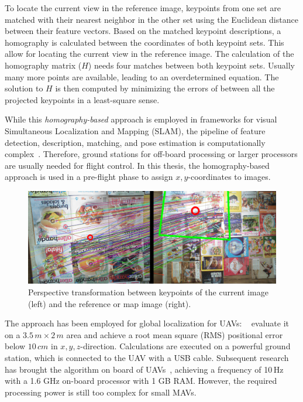 \documentclass[11pt]{report}
\begin{document}
To locate the current view in the reference image, keypoints from one
set are matched with their nearest neighbor in the other set using the
Euclidean distance between their feature vectors. Based on the matched
keypoint descriptions, a homography is calculated between the
coordinates of both keypoint sets. This allow for locating the current
view in the reference image. The calculation of the homography matrix
($H$) needs four matches between both keypoint sets. Usually many more
points are available, leading to an overdetermined equation. The
solution to $H$ is then computed by minimizing the errors of between
all the projected keypoints in a least-square sense.

While this \emph{homography-based} approach is employed in frameworks
for visual Simultaneous Localization and Mapping (SLAM), the pipeline
of feature detection, description, matching, and pose estimation is
computationally complex~\cite{kendall2015posenet}. Therefore, ground
stations for off-board processing or larger processors are usually
needed for flight control. In this thesis, the homography-based
approach is used in a pre-flight phase to assign $x,y$-coordinates to
images.
\begin{figure}[h]
\begin{center}
\includegraphics[width=0.85\columnwidth]{sift}
\caption{{\label{fig:sift}Perspective transformation between keypoints of the current
    image (left) and the reference or map image (right).%
  }}
\end{center}
\end{figure}
The approach has been employed for global localization for UAVs:
\citeauthor{blosch2010vision}~\cite{blosch2010vision} evaluate it on a
$3.5\,m \times 2\,m$ area and achieve a root mean square (RMS)
positional error below $10\,cm$ in $x,y,z$-direction. Calculations are
executed on a powerful ground station, which is connected to the UAV
with a USB cable. Subsequent research has brought the algorithm on
board of UAVs~\cite{achtelik2011onboard}, achieving a frequency of
10\,Hz with a 1.6 GHz on-board processor with 1 GB RAM. However, the
required processing power is still too complex for small
MAVs. %
\end{document}
